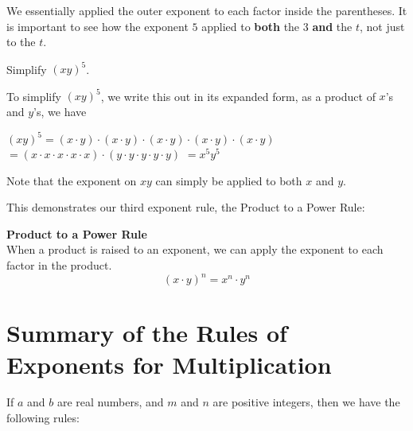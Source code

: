 \documentclass{ximera}
\begin{document}
        We essentially applied the outer exponent to each factor inside the parentheses.
        It is important to see how the exponent $5$ applied to \textbf{both} the $3$ \textbf{and} the $t$,
        not just to the $t$.
   

 \begin{example}   
          Simplify $(xy)^5$.
    
          To simplify $(xy)^5$,
          we write this out in its expanded form,
          as a product of $x$'s and $y$'s, we have

            $(xy)^5 =(x \cdot y) \cdot (x \cdot y) \cdot (x \cdot y) \cdot (x \cdot y) \cdot (x \cdot y)$
            $=(x \cdot x \cdot x \cdot x \cdot x) \cdot (y \cdot y \cdot y \cdot y \cdot y)$
            $=x^5 y^5$

          Note that the exponent on $xy$ can simply be applied to both $x$ and $y$.
\end{example}


      This demonstrates our third exponent rule,
      the Product to a Power Rule:
\begin{callout}
\textbf{ \Large Product to a Power Rule} \\
      When a product is raised to an exponent,
      we can apply the exponent to each factor in the product.
$$
        \left(x\cdot y\right)^n = x^{n}\cdot y^{n}
 $$
\end{callout}


      \section{Summary of the Rules of Exponents for Multiplication}
  


          If $a$ and $b$ are real numbers,
          and $m$ and $n$ are positive integers,
          then we have the following rules:
 
\end{document}
